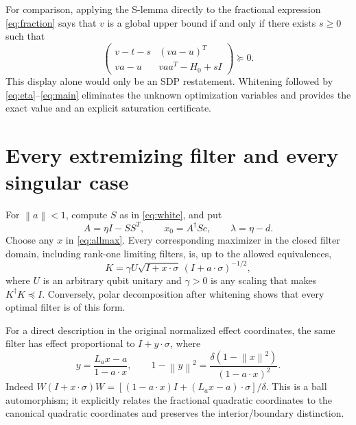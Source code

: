 \documentclass[11pt]{article}
\theoremstyle{remark}\newtheorem{remark}[theorem]{Remark}
\newcommand{\norm}[1]{\left\lVert#1\right\rVert}
\begin{document}
For comparison, applying the S-lemma directly to the fractional expression
\eqref{eq:fraction} says that $v$ is a global upper bound if and only if
there exists $s\geq0$ such that
\begin{equation}\label{eq:originalslemma}
 \begin{pmatrix}
 v-t-s&(va-u)^T\\ va-u&vaa^T-H_0+sI
 \end{pmatrix}\succeq0.
\end{equation}
This display alone would only be an SDP restatement. Whitening followed by
\eqref{eq:eta}--\eqref{eq:main} eliminates the unknown optimization variables
and provides the exact value and an explicit saturation certificate.

\section{Every extremizing filter and every singular case}

For $\norm a<1$, compute $S$ as in \eqref{eq:white}, and put
\begin{equation}\label{eq:filterdata}
 A=\eta I-SS^T,\qquad x_0=A^\dagger Sc,\qquad \lambda=\eta-d.
\end{equation}
Choose any $x$ in \eqref{eq:allmax}. Every corresponding maximizer in the
closed filter domain, including rank-one limiting filters, is, up to the
allowed equivalences,
\begin{equation}\label{eq:filter}\boxed{
 K=\gamma U\sqrt{I+x\cdot\sigma}\,(I+a\cdot\sigma)^{-1/2},}
\end{equation}
where $U$ is an arbitrary qubit unitary and $\gamma>0$ is any scaling that
makes $K^\dagger K\preceq I$. Conversely, polar decomposition after
whitening shows that every optimal filter is of this form.

For a direct description in the original normalized effect coordinates,
the same filter has effect proportional to $I+y\cdot\sigma$, where
\begin{equation}\label{eq:ballmap}
 y=\frac{L_ax-a}{1-a\cdot x},\qquad
 1-\norm y^2=\frac{\delta(1-\norm x^2)}{(1-a\cdot x)^2}.
\end{equation}
Indeed $W(I+x\cdot\sigma)W=
[(1-a\cdot x)I+(L_ax-a)\cdot\sigma]/\delta$.
This is a ball automorphism; it explicitly relates the fractional quadratic
coordinates to the canonical quadratic coordinates and preserves the
interior/boundary distinction.
\end{document}
